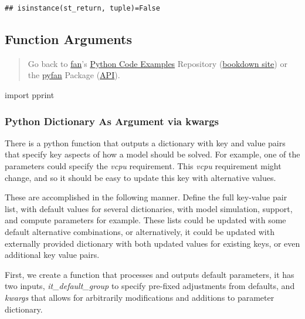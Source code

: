 \documentclass[
]{book}
\newenvironment{Shaded}{\begin{snugshade}}{\end{snugshade}}
\newcommand{\ImportTok}[1]{#1}
\newcommand{\NormalTok}[1]{#1}
\begin{document}
\begin{verbatim}
## isinstance(st_return, tuple)=False
\end{verbatim}

\hypertarget{function-arguments}{%
\subsection{Function Arguments}\label{function-arguments}}

\begin{quote}
Go back to \href{http://fanwangecon.github.io/}{fan}'s \href{https://fanwangecon.github.io/Py4Econ/}{Python Code Examples} Repository (\href{https://fanwangecon.github.io/Py4Econ/bookdown}{bookdown site}) or the \href{https://pyfan.readthedocs.io/en/latest/}{pyfan} Package (\href{https://pyfan.readthedocs.io/en/latest/reference.html}{API}).
\end{quote}

\begin{Shaded}
\begin{Highlighting}[]
\ImportTok{import}\NormalTok{ pprint}
\end{Highlighting}
\end{Shaded}

\hypertarget{python-dictionary-as-argument-via-kwargs}{%
\subsubsection{Python Dictionary As Argument via kwargs}\label{python-dictionary-as-argument-via-kwargs}}

There is a python function that outputs a dictionary with key and value pairs that specify key aspects of how a model should be solved. For example, one of the parameters could specify the \emph{vcpu} requirement. This \emph{vcpu} requirement might change, and so it should be easy to update this key with alternative values.

These are accomplished in the following manner. Define the full key-value pair list, with default values for several dictionaries, with model simulation, support, and compute parameters for example. These lists could be updated with some default alternative combinations, or alternatively, it could be updated with externally provided dictionary with both updated values for existing keys, or even additional key value pairs.

First, we create a function that processes and outputs default parameters, it has two inputs, \emph{it\_default\_group} to specify pre-fixed adjustments from defaults, and \emph{kwargs} that allows for arbitrarily modifications and additions to parameter dictionary.
\end{document}
